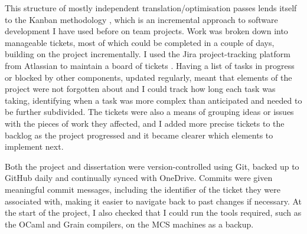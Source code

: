 This structure of mostly independent translation/optimisation passes lends itself to the Kanban methodology \cite{kanban}, which is an incremental approach to software development I have used before on team projects. Work was broken down into manageable tickets, most of which could be completed in a couple of days, building on the project incrementally. I used the Jira project-tracking platform from Atlassian to maintain a board of tickets \cite{jira}. Having a list of tasks in progress or blocked by other components, updated regularly, meant that elements of the project were not forgotten about and I could track how long each task was taking, identifying when a task was more complex than anticipated and needed to be further subdivided. The tickets were also a means of grouping ideas or issues with the pieces of work they affected, and I added more precise tickets to the backlog as the project progressed and it became clearer which elements to implement next.


Both the project and dissertation were version-controlled using Git, backed up to GitHub daily and continually synced with OneDrive. Commits were given meaningful commit messages, including the identifier of the ticket they were associated with, making it easier to navigate back to past changes if necessary. At the start of the project, I also checked that I could run the tools required, such as the OCaml and Grain compilers, on the MCS machines as a backup. 



